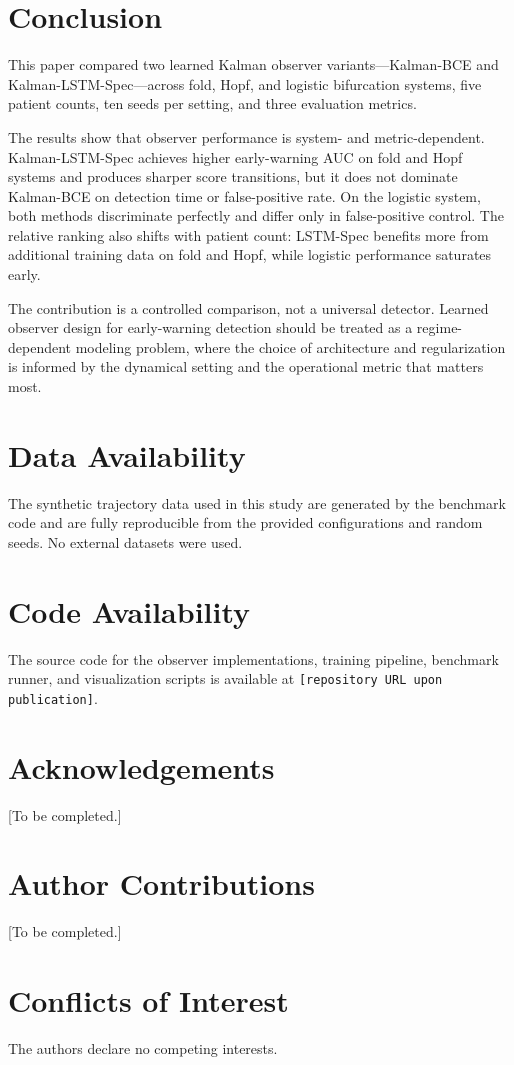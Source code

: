 \section{Conclusion}
\label{sec:conclusion}

This paper compared two learned Kalman observer variants---Kalman-BCE and
Kalman-LSTM-Spec---across fold, Hopf, and logistic bifurcation systems, five
patient counts, ten seeds per setting, and three evaluation metrics.

The results show that observer performance is system- and metric-dependent.
Kalman-LSTM-Spec achieves higher early-warning AUC on fold and Hopf systems and
produces sharper score transitions, but it does not dominate Kalman-BCE on
detection time or false-positive rate. On the logistic system, both methods
discriminate perfectly and differ only in false-positive control. The relative
ranking also shifts with patient count: LSTM-Spec benefits more from additional
training data on fold and Hopf, while logistic performance saturates early.

The contribution is a controlled comparison, not a universal detector. Learned
observer design for early-warning detection should be treated as a
regime-dependent modeling problem, where the choice of architecture and
regularization is informed by the dynamical setting and the operational metric
that matters most.

\section*{Data Availability}

The synthetic trajectory data used in this study are generated by the benchmark
code and are fully reproducible from the provided configurations and random
seeds. No external datasets were used.

\section*{Code Availability}

The source code for the observer implementations, training pipeline, benchmark
runner, and visualization scripts is available at
\texttt{[repository URL upon publication]}.

\section*{Acknowledgements}

[To be completed.]

\section*{Author Contributions}

[To be completed.]

\section*{Conflicts of Interest}

The authors declare no competing interests.
